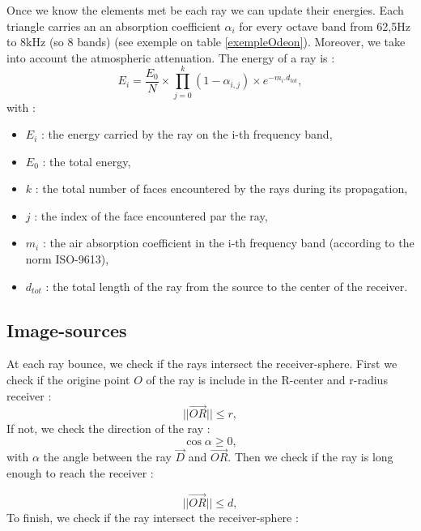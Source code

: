 \documentclass[AMA,STIX1COL]{WileyNJD-v2}
\begin{document}

Once we know the elements met be each ray we can update their energies. Each triangle carries an an absorption coefficient $\alpha_i$ for every octave band from 62,5Hz to 8kHz (so 8 bands) (see exemple on table \ref{exempleOdeon}). Moreover, we take into account the atmospheric attenuation. The energy of a ray is :
\begin{equation}
E_{i} =  \frac{E_0}{N} \times \prod_{j=0}^{k}{(1-\alpha_{i,j})} \times e^{-m_i . d_{tot}},
\end{equation}
with : 
\begin{itemize}
\item $E_{i}$ : the energy carried by the ray on the i-th frequency band,
\item $E_{0}$ : the total energy,
\item $k$ : the total number of faces encountered by the rays during its propagation,
\item $j$ : the index of the face encountered par the ray,
\item $m_i$ : the air absorption coefficient in the i-th frequency band (according to the norm ISO-9613),
\item $ d_{tot}$ : the total length of the ray from the source to the center of the receiver.
\end{itemize}


\subsection{Image-sources}

At each ray bounce, we check if the rays intersect the receiver-sphere. First we check if the origine point $O$ of the ray is include in the R-center and r-radius receiver :
\begin{equation}
||\overrightarrow{OR}|| \leqslant r,
\end{equation}
%
If not, we check the direction of the ray :
\begin{equation}
\cos{\alpha} \geqslant 0,
\end{equation}
with $\alpha$ the angle between the ray $\overrightarrow{D}$ and $\overrightarrow{OR}$. Then we check if the ray is long enough to reach the receiver :

\begin{equation}
||\overrightarrow{OR}|| \leqslant d,
\end{equation}
%
To finish, we check if the ray intersect the receiver-sphere :
\end{document}
